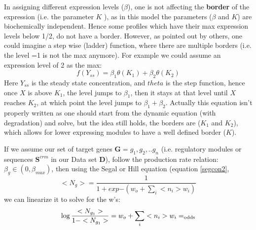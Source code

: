 In assigning different expression levels ($\beta$), one is not affecting the \textbf{border} of the expression (i.e. the parameter $K$ ), as in this model the parameters ($\beta$ and $K$) are biochemically independent.  Hence some profiles which have their max expression levels below 1/2, do not have a border.  However, as pointed out by others, one could imagine a step wise (ladder) function, where there are multiple borders (i.e. the level =1 is not the max anymore).  For example we could assume an expression level of 2 as the max:
\begin{equation}\label{}
    f(Y_{ss}) = \beta_1\theta(K_1) + \beta_2\theta(K_2)
\end{equation}
Here $Y_{ss}$ is the steady state concentration, and $theta$ is the step function, hence once $X$ is above $K_1$, the level jumps to $\beta_1$, then it stays at that level until $X$ reaches $K_2$, at which point the level jumps to $\beta_1 + \beta_2$.  Actually this equation isn't properly written as one should start from the dynamic equation (with degradation) and solve, but the idea still holds, the borders are ($K_1$ and $K_2$), which allows for lower expressing modules to have a well defined border ($K$).

If we assume our set of target genes $\textbf{G}= {g_1,g_2,..g_n}$  (i.e. regulatory modules or sequences $\textbf{S}^{crm}$ in our Data set $\textbf{D}$), follow the production rate relation: $\beta_g \in (0,\beta_{max})$,  then using the Segal or Hill equation (equation \ref{segcon2},
 \begin{equation}\label{}
    <N_{g}> = \frac{1}{1 + exp{-(w_o +\sum_i<n_i>w_i)}}
 \end{equation}
 we can linearize it to solve for the w's:
 \begin{equation}\label{chi}
    \log{\frac{<N_{g_1}>}{1-<N_{g_1}>}} = w_o +\sum_i<n_i>w_i =\rm_{odds}
 \end{equation}

